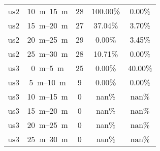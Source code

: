 \begin{table}[htbp]
\begin{tabular}[t]{ccccc}
        us2                & \SIrange{10}{15}{\metre} & 28              & 100.00\%    & 0.00\%      \\
        us2                & \SIrange{15}{20}{\metre} & 27              & 37.04\%     & 3.70\%      \\
        us2                & \SIrange{20}{25}{\metre} & 29              & 0.00\%      & 3.45\%      \\
        us2                & \SIrange{25}{30}{\metre} & 28              & 10.71\%     & 0.00\%      \\
        us3                & \SIrange{0}{5}{\metre}   & 25              & 0.00\%      & 40.00\%     \\
        us3                & \SIrange{5}{10}{\metre}  & 9               & 0.00\%      & 0.00\%      \\
        us3                & \SIrange{10}{15}{\metre} & 0               & nan\%       & nan\%       \\
        us3                & \SIrange{15}{20}{\metre} & 0               & nan\%       & nan\%       \\
        us3                & \SIrange{20}{25}{\metre} & 0               & nan\%       & nan\%       \\
        us3                & \SIrange{25}{30}{\metre} & 0               & nan\%       & nan\%       \\
        \bottomrule
    \end{tabular}
\end{table}

